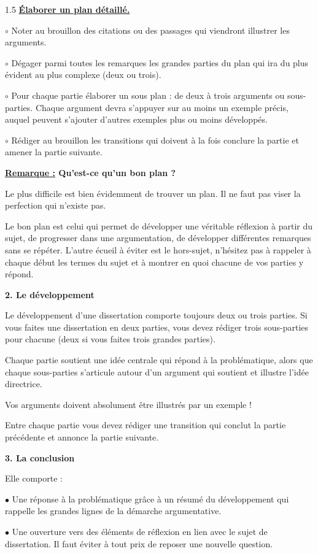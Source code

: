\documentclass[12pt]{article}
\begin{document}
\begin{spacing}{1.5}
\underline{\textbf{Élaborer un plan détaillé.}}
 
$\circ$ Noter au brouillon des citations ou des passages qui viendront illustrer les arguments. 

$\circ$ Dégager parmi toutes les remarques les grandes parties du plan qui ira du plus évident au 
plus complexe (deux ou trois). 

$\circ$ Pour chaque partie élaborer un sous plan : de deux à trois arguments ou sous-parties. Chaque 
argument devra s'appuyer sur au moins un exemple précis, auquel peuvent s'ajouter d'autres exemples plus ou moins développés. 

$\circ$ Rédiger au brouillon les transitions qui doivent à la fois conclure la partie et amener la partie suivante. 

\quad 
\textbf{\underline{ Remarque :} Qu'est-ce qu'un bon plan ?}
 
\quad Le plus difficile est bien évidemment de trouver un plan. Il ne faut pas viser la perfection qui n'existe pas. 

\quad Le bon plan est celui qui permet de développer une véritable réflexion à partir du sujet, de progresser dans une argumentation, de développer différentes remarques sans se répéter. L'autre écueil à éviter est le hors-sujet, n'hésitez pas à rappeler à chaque début les termes du sujet et à 
montrer en quoi chacune de vos parties y répond.


\quad
\quad
\textbf{2. Le développement}

Le développement d'une dissertation comporte toujours deux ou trois parties. Si vous faites une dissertation en deux parties, vous devez rédiger trois sous-parties pour chacune (deux si vous faites trois grandes parties).

Chaque partie soutient une idée centrale qui répond à la problématique, alors que chaque sous-parties s'articule autour d'un argument qui soutient et illustre l'idée directrice.

Vos arguments doivent absolument être illustrés par un exemple !

Entre chaque partie vous devez rédiger une transition qui conclut la partie précédente et annonce la partie suivante.


\textbf{3. La conclusion}

Elle comporte :
 
$\bullet$ Une réponse à la problématique grâce à un résumé du développement qui rappelle les grandes lignes de la démarche argumentative. 

$\bullet$ Une ouverture vers des éléments de réflexion en lien avec le sujet de dissertation. Il faut éviter à tout prix de reposer une nouvelle question.

\end{spacing}
\end{document}
